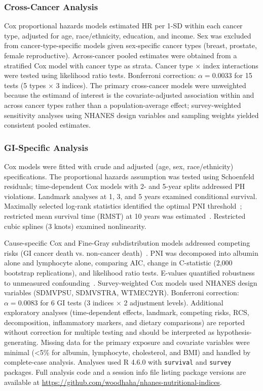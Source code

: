 \documentclass[review]{elsarticle}
\begin{document}
\subsubsection{Cross-Cancer Analysis}

Cox proportional hazards models estimated HR per 1-SD within each cancer type, adjusted for age, race/ethnicity, education, and income. Sex was excluded from cancer-type-specific models given sex-specific cancer types (breast, prostate, female reproductive). Across-cancer pooled estimates were obtained from a stratified Cox model with cancer type as strata. Cancer type $\times$ index interactions were tested using likelihood ratio tests. Bonferroni correction: $\alpha=0.0033$ for 15 tests (5 types $\times$ 3 indices). The primary cross-cancer models were unweighted because the estimand of interest is the covariate-adjusted association within and across cancer types rather than a population-average effect; survey-weighted sensitivity analyses using NHANES design variables and sampling weights yielded consistent pooled estimates.

\subsubsection{GI-Specific Analysis}

Cox models were fitted with crude and adjusted (age, sex, race/ethnicity) specifications. The proportional hazards assumption was tested using Schoenfeld residuals; time-dependent Cox models with 2- and 5-year splits addressed PH violations. Landmark analyses at 1, 3, and 5 years examined conditional survival. Maximally selected log-rank statistics identified the optimal PNI threshold~\cite{han2022}; restricted mean survival time (RMST) at 10 years was estimated~\cite{royston2013}. Restricted cubic splines (3 knots) examined nonlinearity.

Cause-specific Cox and Fine-Gray subdistribution models addressed competing risks (GI cancer death vs. non-cancer death)~\cite{putter2007,finegray1999,andersen2012}. PNI was decomposed into albumin alone and lymphocyte alone, comparing AIC, change in C-statistic (2,000 bootstrap replications), and likelihood ratio tests. E-values quantified robustness to unmeasured confounding~\cite{vanderweele2017}. Survey-weighted Cox models used NHANES design variables (SDMVPSU, SDMVSTRA, WTMEC2YR). Bonferroni correction: $\alpha=0.0083$ for 6 GI tests (3 indices $\times$ 2 adjustment levels). Additional exploratory analyses (time-dependent effects, landmark, competing risks, RCS, decomposition, inflammatory markers, and dietary comparisons) are reported without correction for multiple testing and should be interpreted as hypothesis-generating. Missing data for the primary exposure and covariate variables were minimal (<5\% for albumin, lymphocyte, cholesterol, and BMI) and handled by complete-case analysis. Analyses used R 4.6.0 with \texttt{survival} and \texttt{survey} packages. Full analysis code and a session info file listing package versions are available at \url{https://github.com/woodhaha/nhanes-nutritional-indices}.
\end{document}
